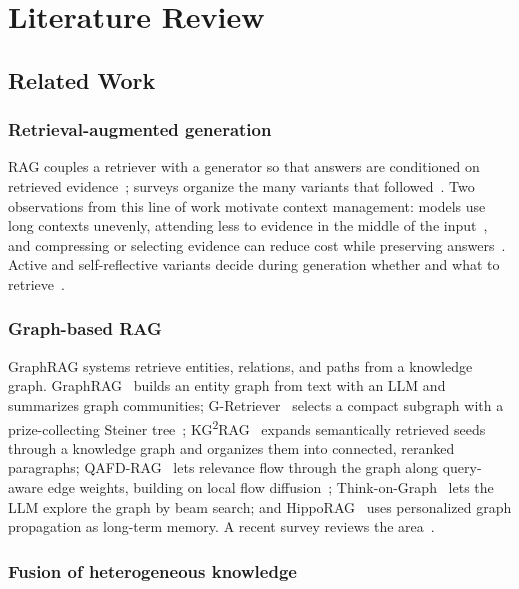 \documentclass[conference]{IEEEtran}
\begin{document}
\section{Literature Review}\label{sec:lit}

\subsection{Related Work}

\subsubsection{Retrieval-augmented generation}

RAG couples a retriever with a generator so that answers are conditioned on retrieved evidence~\cite{lewis2020}; surveys organize the many variants that followed~\cite{gao2023}. Two observations from this line of work motivate context management: models use long contexts unevenly, attending less to evidence in the middle of the input~\cite{liu2024lost}, and compressing or selecting evidence can reduce cost while preserving answers~\cite{jiang2024longllmlingua}. Active and self-reflective variants decide during generation whether and what to retrieve~\cite{jiang2023flare,asai2024selfrag}.

\subsubsection{Graph-based RAG}

GraphRAG systems retrieve entities, relations, and paths from a knowledge graph. GraphRAG~\cite{edge2024graphrag} builds an entity graph from text with an LLM and summarizes graph communities; G-Retriever~\cite{he2024gretriever} selects a compact subgraph with a prize-collecting Steiner tree~\cite{goemans1995,hegde2015pcst}; KG\textsuperscript{2}RAG~\cite{zhu2025kg2rag} expands semantically retrieved seeds through a knowledge graph and organizes them into connected, reranked paragraphs; QAFD-RAG~\cite{zhou2026qafd} lets relevance flow through the graph along query-aware edge weights, building on local flow diffusion~\cite{fountoulakis2020flow}; Think-on-Graph~\cite{sun2024tog} lets the LLM explore the graph by beam search; and HippoRAG~\cite{gutierrez2024hipporag} uses personalized graph propagation as long-term memory. A recent survey reviews the area~\cite{peng2024survey}.

\subsubsection{Fusion of heterogeneous knowledge}
\end{document}
